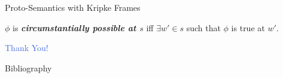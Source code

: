 \documentclass[xcolor=dvipsnames]{beamer}
\newcommand{\term}[1]{\textbf{\emph{#1}}}
\begin{document}
\begin{frame}{Proto-Semantics with Kripke Frames}
\begin{definition}
$\phi$ is \term{circumstantially possible at $s$} iff $\exists w' \in s$ such that $\phi$ is true at $w'$.
\end{definition}


\end{frame}


\begin{frame}
\begin{center}
{\LARGE \textcolor{RoyalBlue}{Thank You!}}
\end{center}
\end{frame}

\begin{frame}{Bibliography}



\end{frame}
\end{document}
